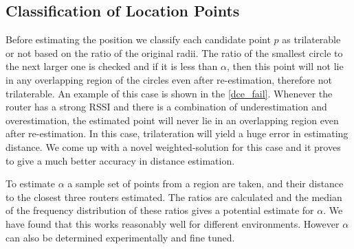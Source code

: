 \documentclass[twocolumn, 11pt]{IEEEtran}
\begin{document}







\subsection{Classification of Location Points}

Before estimating the position we classify each candidate point $p$ as trilaterable or not based on the ratio of the original radii. The ratio of the smallest circle to the next larger one is checked and if it is less than $\alpha$, then this point will not lie in any overlapping region of the circles even after re-estimation, therefore not trilaterable. An example of this case is shown in the \ref{dce_fail}. Whenever the router has a strong RSSI and there is a combination of underestimation and overestimation, the estimated point will never lie in an overlapping region even after re-estimation. In this case, trilateration will yield a huge error in estimating distance. We come up with a novel weighted-solution for this case and it proves to give a much better accuracy in distance estimation.
 
To estimate $\alpha$ a sample set of points from a region are taken, and their distance to the closest three routers estimated. The ratios are calculated and the median of the frequency distribution of these ratios gives a potential estimate for $\alpha$. We have found that this works reasonably well for different environments. However $\alpha$ can also be determined experimentally and fine tuned. 
\end{document}
